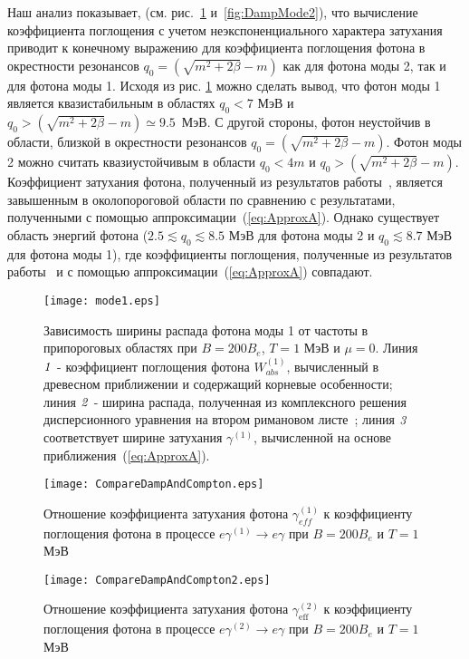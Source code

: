 Наш анализ показывает, (см. рис.~\ref{fig:DampMode1} и~\ref{fig:DampMode2}),
что вычисление коэффициента  поглощения с учетом неэкспоненциального характера 
затухания приводит к конечному выражению для коэффициента  поглощения фотона в окрестности резонансов 
$q_0 = (\sqrt{m^2+2 \beta} - m )$ как для фотона моды 2, так и для фотона моды 1. Исходя из рис. \ref{fig:DampMode1} можно сделать вывод, что фотон моды 1 является квазистабильным в областях $q_0<7$ МэВ и $q_0>(\sqrt{m^2+2 \beta} - m)\simeq 9.5$~МэВ. С другой стороны, фотон неустойчив в области, близкой в окрестности резонансов $q_0 = (\sqrt{m^2+2 \beta} - m )$. Фотон моды 2 можно считать квазиустойчивым в области $q_0<4m$ и $q_0>(\sqrt{m^2+2 \beta} - m)$. Коэффициент затухания фотона, полученный из результатов работы~\cite{Shabad:1988}, является завышенным в околопороговой области по сравнению с результатами, полученными с помощью аппроксимации~(\ref{eq:ApproxA}). Однако существует область энергий фотона ($2.5\lesssim q_0\lesssim 8.5$ МэВ для фотона моды 2 и $q_0\lesssim8.7$ МэВ для фотона моды 1), где коэффициенты поглощения, полученные из результатов работы~\cite{Shabad:1988} и с помощью аппроксимации~(\ref{eq:ApproxA}) совпадают.


\begin{figure}[t]\centering
	\texttt{[image: mode1.eps]}
	\caption{\label{fig:fig1}Зависимость ширины распада фотона моды 1 от частоты в припороговых областях при $B=200 B_e$, $T=1$ МэВ и $ \mu=0 $. Линия $ {\it 1} $ - коэффициент поглощения фотона $ W ^ {(1)}_{abs} $,
		вычисленный в древесном приближении и содержащий корневые особенности; линия $ {\it 2} $ - ширина распада, полученная из комплексного решения дисперсионного уравнения на втором римановом листе~\cite{Shabad:1988}; линия $ {\it 3} $ соответствует ширине затухания $ \gamma^{(1)}$, вычисленной на основе приближения~(\ref{eq:ApproxA}).}\label{fig:DampMode1}
\end{figure}

\begin{figure}[t!]\centering
	\texttt{[image: CompareDampAndCompton.eps]}
	\caption{\label{fig:ComptonandDamp} Отношение коэффициента затухания фотона $\gamma_{eff}^{(1)}$ к коэффициенту поглощения фотона в процессе $e\gamma^{(1)}\to e\gamma$ при $B=200B_e$ и $T=1$ МэВ}
\end{figure}
\clearpage
\begin{figure}[t!]\centering
	\texttt{[image: CompareDampAndCompton2.eps]}
	\caption{\label{fig:ComptonandDamp2} Отношение коэффициента затухания фотона $\gamma_\text{eff}^{(2)}$ к коэффициенту поглощения фотона в процессе $e\gamma^{(2)}\to e\gamma$ при $B=200B_e$ и $T=1$ МэВ}
\end{figure}


